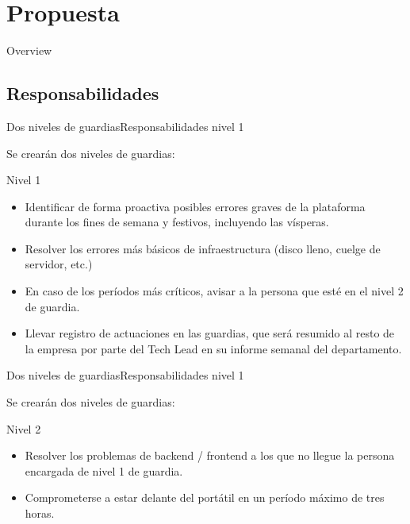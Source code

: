 \documentclass[12pt, aspectratio=169]{beamer} %
\begin{document}
\section{Propuesta}

\begin{frame}{Overview}
\tableofcontents
\end{frame}


\subsection{Responsabilidades}

\begin{frame}{Dos niveles de guardias}{Responsabilidades nivel 1}

  Se crearán dos niveles de guardias:

  \begin{block}{Nivel 1}
    \begin{itemize}
      \item Identificar de forma proactiva posibles errores graves de la plataforma durante los fines de semana y festivos, incluyendo las vísperas. 
      \item Resolver los errores más básicos de infraestructura (disco lleno, cuelge de servidor, etc.)
      \item En caso de los períodos más críticos, avisar a la persona que esté en el nivel 2 de guardia.
      \item Llevar registro de actuaciones en las guardias, que será resumido al resto de la empresa por parte del Tech Lead en su informe semanal del departamento.
    \end{itemize}
  \end{block}

\end{frame}

\begin{frame}{Dos niveles de guardias}{Responsabilidades nivel 1}

  Se crearán dos niveles de guardias:
  
  \begin{block}{Nivel 2}
    \begin{itemize}
      \item Resolver los problemas de backend / frontend a los que no llegue la persona encargada de nivel 1 de guardia.
      \item Comprometerse a estar delante del portátil en un período máximo de tres horas.
    \end{itemize}
  \end{block}

\end{frame}
\end{document}
